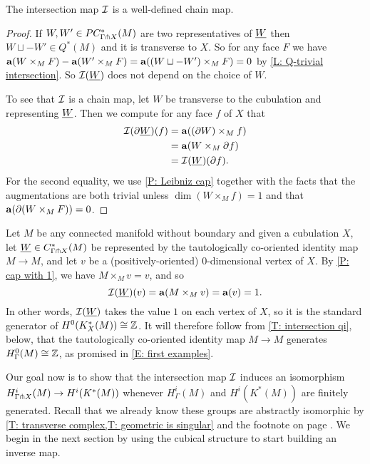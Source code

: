 \begin{proposition}
	The intersection map $\mathcal{I}$ is a well-defined chain map.
\end{proposition}

\begin{proof}
	If $W, W' \in PC^*_{\Gamma \pitchfork X}(M)$ are two representatives of $\underline{W}$ then $W \sqcup -W' \in Q^*(M)$ and it is transverse to $X$.
	So for any face $F$ we have $\mathbf{a}(W \times_M F)-\mathbf{a}(W' \times_M F) = \mathbf{a}((W \sqcup -W') \times_M F) = 0$ by \cref{L: Q-trivial intersection}.
	So $\mathcal{I}(\underline{W})$ does not depend on the choice of $W$.

	To see that $\mathcal{I}$ is a chain map, let $W$ be transverse to the cubulation and representing $\underline{W}$.
	Then we compute for any face $f$ of $X$ that
	\begin{align*}
		\mathcal{I}(\partial\underline{W})(f)& = \mathbf{a}((\partial W) \times_M f)\\
		& = \mathbf{a}(W \times_M \partial f)\\
		& = \mathcal{I}(\underline{W})(\partial f).
	\end{align*}
	For the second equality, we use \cref{P: Leibniz cap} together with the facts that the augmentations are both trivial unless $\dim(W \times_M f) = 1$ and that $\mathbf{a}(\partial (W \times_M F)) = 0$.
\end{proof}

\begin{example}\label{E: coho 0 generator}
	Let $M$ be any connected manifold without boundary and given a cubulation $X$, let $\underline{W} \in C^*_{\Gamma \pitchfork X}(M)$ be represented by the tautologically co-oriented identity map $M \to M$, and let $v$ be a (positively-oriented) $0$-dimensional vertex of $X$.
	By \cref{P: cap with 1}, we have $M \times_M v = v$, and so
	\[\mathcal{I}(\underline{W})(v) = \mathbf{a}(M \times_M v) = \mathbf{a}(v) = 1.\]
	In other words, $\mathcal{I}(\underline{W})$ takes the value $1$ on each vertex of $X$, so it is the standard generator of $H^0(K^*_X(M)) \cong \mathbb{Z}$.
	It will therefore follow from \cref{T: intersection qi}, below, that the tautologically co-oriented identity map $M \to M$ generates $H^0_\Gamma(M) \cong \mathbb{Z}$, as promised in \cref{E: first examples}.
\end{example}

Our goal now is to show that the intersection map $\mathcal{I}$ induces an isomorphism $H^i_{\Gamma \pitchfork X}(M) \to H^i(K^*(M))$ whenever $H^i_\Gamma(M)$ and $H^i(K^*(M))$ are finitely generated.
Recall that we already know these groups are abstractly isomorphic by \cref{T: transverse complex,T: geometric is singular} and the footnote on page \pageref{FN: cubical and singular}.
We begin in the next section by using the cubical structure to start building an inverse map.

